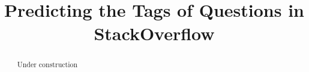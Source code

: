 \documentclass{article} %
\title{Predicting the Tags of Questions in StackOverflow}
\begin{document}
\maketitle

\begin{abstract}
Under construction
\end{abstract}









\small{


}
\end{document}
